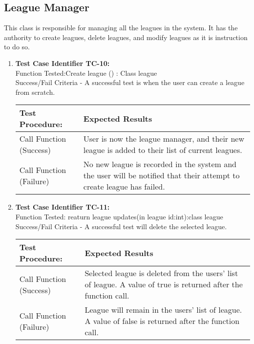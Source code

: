 \subsection{League Manager}
This class is responsible for managing all the leagues in the system. It has the
authority to create leagues, delete leagues, and modify leagues as it is
instruction to do so.\\
\begin{enumerate}
  \item
    \textbf{Test Case Identifier TC-10:}\\

    Function Tested:Create league () : Class league\\

    Success/Fail Criteria - A successful test is when the user can create a
    league from scratch.\\

    \begin{longtable}{|p{2in}|p{4.5in}|}
    \hline
    {\large \color{color1}Test Procedure:}&{\large \color{color1}Expected Results}\\ \hline
    Call Function (Success) & User is now the league manager, and their new
    league is added to their list of current leagues. \\ \hline
    Call Function (Failure) & No new league is recorded in the system and the
    user will be notified that their attempt to create league has failed.
    \\ \hline
    \end{longtable}
    \vspace{5mm}
 

  \item
    \textbf{Test Case Identifier TC-11:}\\

    Function Tested: reaturn league updates(in league id:int):class league \\

    Success/Fail Criteria - A successful test will delete the selected league.\\

    \begin{longtable}{|p{2in}|p{4.5in}|}
    \hline
    {\large \color{color1}Test Procedure:}&{\large \color{color1}Expected Results}\\ \hline
    Call Function (Success) & Selected league is deleted from the users’ list of
    league. A value of true is returned after the function call. \\ \hline
    Call Function (Failure) & League will remain in the users’ list of league. A
    value of false is returned after the function call. \\ \hline
    \end{longtable}
    \vspace{5mm}


\end{enumerate}
